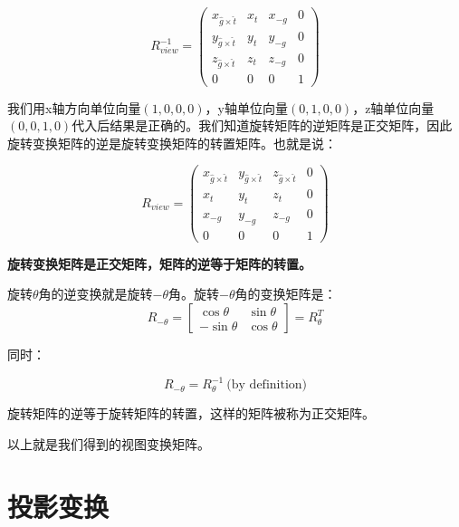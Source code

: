 \documentclass[openany]{progbookcn}
\begin{document}
\begin{equation}
	R^{-1}_{view}=\begin{pmatrix}x_{\hat{g}\times\hat{t}}&x_t&x_{-g}&0\\y_{\hat{g}\times\hat{t}}&y_t&y_{-g}&0\\z_{\hat{g}\times\hat{t}}&z_t&z_{-g}&0\\0&0&0&1\end{pmatrix}
\end{equation}

我们用x轴方向单位向量$(1,0,0,0)$，y轴单位向量$(0,1,0,0)$，z轴单位向量$(0,0,1,0)$代入后结果是正确的。我们知道旋转矩阵的逆矩阵是正交矩阵，因此旋转变换矩阵的逆是旋转变换矩阵的转置矩阵。也就是说：

\begin{equation}
	R_{view}=\begin{pmatrix}x_{\hat{g}\times\hat{t}}&y_{\hat{g}\times\hat{t}}&z_{\hat{g}\times\hat{t}}&0\\x_t&y_t&z_t&0\\x_{-g}&y_{-g}&z_{-g}&0\\0&0&0&1\end{pmatrix}
\end{equation}

\begin{information}
	\textbf{旋转变换矩阵是正交矩阵，矩阵的逆等于矩阵的转置。}
	
	旋转$\theta$角的逆变换就是旋转$-\theta$角。旋转$-\theta$角的变换矩阵是：
	\begin{equation}
		R_{-\theta}=\begin{bmatrix}\cos\theta&\sin\theta\\-\sin\theta&\cos\theta\end{bmatrix} = R_{\theta}^T
	\end{equation}

	同时：
	
	\begin{equation}
		R_{-\theta}=R_{\theta}^{-1}\ \text{(by definition)}
	\end{equation}

	旋转矩阵的逆等于旋转矩阵的转置，这样的矩阵被称为正交矩阵。

\end{information}

以上就是我们得到的视图变换矩阵。

\section{投影变换}
\end{document}
